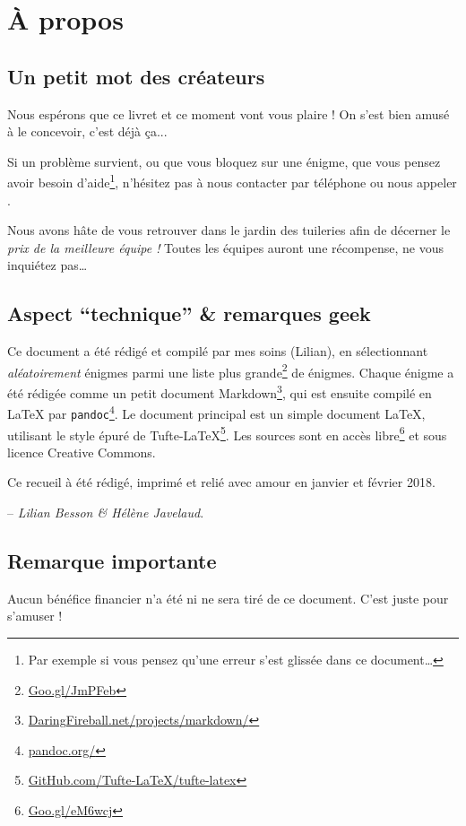 \chapter{À propos}

\section*{Un petit mot des créateurs}

Nous espérons que ce livret et ce moment vont vous plaire !
On s'est bien amusé à le concevoir, c'est déjà ça...

Si un problème survient, ou que vous bloquez sur une énigme, que vous pensez avoir besoin d'aide\footnote{Par exemple si vous pensez qu'une erreur s'est glissée dans ce document…}, n'hésitez pas à nous contacter par téléphone ou nous appeler
.

Nous avons hâte de vous retrouver dans le jardin des tuileries afin de décerner le \emph{prix de la meilleure équipe !}
Toutes les équipes auront une récompense, ne vous inquiétez pas…


\section*{Aspect ``technique'' \& remarques geek}
Ce document a été rédigé et compilé par mes soins (Lilian), en sélectionnant \emph{aléatoirement} \nbenigmes{} énigmes parmi une liste plus grande\footnote{\url{Goo.gl/JmPFeb}} de \totalnbenigmes{} énigmes.
%
Chaque énigme a été rédigée comme un petit document Markdown\footnote{\url{DaringFireball.net/projects/markdown/}},
qui est ensuite compilé en \LaTeX{} par \texttt{pandoc}\footnote{\url{pandoc.org/}}.
%
Le document principal est un simple document \LaTeX,
utilisant le style épuré de Tufte-\LaTeX{}\footnote{\url{GitHub.com/Tufte-LaTeX/tufte-latex}}.
%
Les sources sont en accès libre\footnote{\url{Goo.gl/eM6wcj}} et sous licence Creative Commons.

Ce recueil à été rédigé, imprimé et relié avec amour en janvier et février 2018.


\hfill{} -- \emph{Lilian Besson \& Hélène Javelaud}.

\section*{Remarque importante}
Aucun bénéfice financier n'a été ni ne sera tiré de ce document.
C'est juste pour s'amuser !

